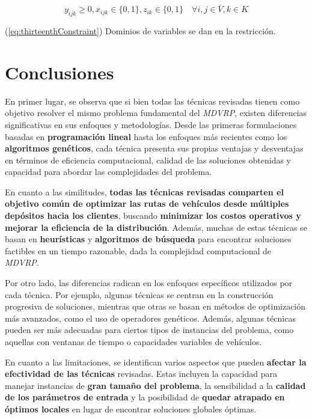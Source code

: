 \documentclass[letter, 10pt]{article}
\begin{document}
\begin{equation}
    \label{eq:thirteenthConstraint}
    y_{ijk} \geq 0, x_{ijk} \in \{0, 1\}, z_{ik} \in \{0, 1\} \quad \forall i, j \in \overline{V}, k \in K
\end{equation}

(\ref{eq:thirteenthConstraint}) Dominios de variables se dan en la restricción.

\section{Conclusiones}

En primer lugar, se observa que si bien todas las técnicas revisadas tienen como objetivo resolver el mismo problema fundamental del \textit{MDVRP}, existen diferencias significativas en sus enfoques y metodologías. Desde las primeras formulaciones basadas en \textbf{programación lineal} hasta los enfoques más recientes como los \textbf{algoritmos genéticos}, cada técnica presenta sus propias ventajas y desventajas en términos de eficiencia computacional, calidad de las soluciones obtenidas y capacidad para abordar las complejidades del problema.

En cuanto a las similitudes, \textbf{todas las técnicas revisadas comparten el objetivo común de optimizar las rutas de vehículos desde múltiples depósitos hacia los clientes}, buscando \textbf{minimizar los costos operativos y mejorar la eficiencia de la distribución}. Además, muchas de estas técnicas se basan en \textbf{heurísticas} y \textbf{algoritmos de búsqueda} para encontrar soluciones factibles en un tiempo razonable, dada la complejidad computacional de \textit{MDVRP}.

Por otro lado, las diferencias radican en los enfoques específicos utilizados por cada técnica. Por ejemplo, algunas técnicas se centran en la construcción progresiva de soluciones, mientras que otras se basan en métodos de optimización más avanzados, como el uso de operadores genéticos. Además, algunas técnicas pueden ser más adecuadas para ciertos tipos de instancias del problema, como aquellas con ventanas de tiempo o capacidades variables de vehículos.

En cuanto a las limitaciones, se identifican varios aspectos que pueden \textbf{afectar la efectividad de las técnicas} revisadas. Estas incluyen la capacidad para manejar instancias de \textbf{gran tamaño del problema}, la sensibilidad a la \textbf{calidad de los parámetros de entrada} y la posibilidad de \textbf{quedar atrapado en óptimos locales} en lugar de encontrar soluciones globales óptimas.
\end{document}
